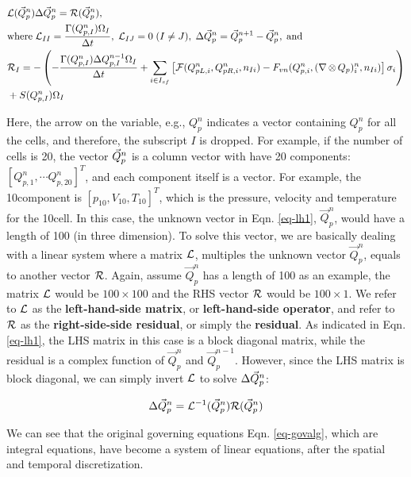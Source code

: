 \documentclass[12pt, letterpaper]{report}
\begin{document}
\begin{align}\label{eq-lh1}
   \begin{split}
      & \mathcal{L}(\vec{Q}_p^n) \Delta \vec{Q}_p^n = \mathcal{R}(\vec{Q}_p^n), \\ & \textrm{where} \; \mathcal{L}_{II} =
      \frac{\Gamma(Q_{p,I}^n)\Omega_I}{\Delta t}, \; \mathcal{L}_{IJ} = 0 \; (I \neq J), \; \Delta \vec{Q}_p^n =
      \vec{Q}_p^{n+1} - \vec{Q}_p^n, \; \textrm{and } \\
      & \mathcal{R}_I = -\left(-\frac{\Gamma(Q_{p,I}^n) \Delta Q_{p,I}^{n-1}\Omega_I}{\Delta t} + \sum_{i \in
            I_{sf}}\left[\mathcal{F}(Q_{pL,i}^n, Q_{pR,i}^n, n_{Ii}) - F_{vn}(Q_{p,i}^n, (\nabla
\mathop{\otimes} Q_p)_i^n, n_{Ii})\right]\sigma_i\right) \\ & + S(Q_{p,I}^n)\Omega_I
   \end{split}
\end{align}

Here, the arrow on the variable, e.g., $Q_p^n$ indicates a vector containing $Q_p^n$ for all the
cells, and therefore, the subscript $I$ is dropped. For example, if the number of cells is 20, the
vector $\vec{Q}_p^n$ is a column vector with have 20 components: $[Q_{p,1}^n, \cdots Q_{p,20}^n]^T$, and
each component itself is a vector. For example, the 10\th component is $[p_{10}, V_{10}, T_{10}]^T$,
which is the pressure, velocity and temperature for the 10\th cell. In this case, the unknown vector
in Eqn.  \ref{eq-lh1}, $\vec{Q}_p^n$, would have a length of 100 (in three dimension). To solve this
vector, we are basically dealing with a linear system where a matrix $\mathcal{L}$, multiples the unknown
vector $\vec{Q}_p^n$, equals to another vector $\mathcal{R}$. Again, assume $\vec{Q}_p^n$ has a length of 100
as an example, the matrix $\mathcal{L}$ would be $100 \times 100$ and the RHS vector $\mathcal{R}$ would be $100
\times 1$. We refer to $\mathcal{L}$ as the {\bf left-hand-side matrix}, or {\bf left-hand-side operator},
and refer to $\mathcal{R}$ as the {\bf right-side-side residual}, or simply the {\bf residual}. As indicated
in Eqn. \ref{eq-lh1}, the LHS matrix in this case is a block diagonal matrix, while the residual is
a complex function of $\vec{Q}_p^n$ and $\vec{Q}_p^{n-1}$. However, since the LHS matrix is block
diagonal, we can simply invert $\mathcal{L}$ to solve $\Delta \vec{Q}_p^n$:

\begin{align*}
   \Delta \vec{Q}_p^n = \mathcal{L}^{-1}(\vec{Q}_p^n) \mathcal{R}(\vec{Q}_p^n)
\end{align*}

We can see that the original governing equations Eqn. \ref{eq-govalg}, which are integral equations, have
become a system of linear equations, after the spatial and temporal discretization. \paraspace
\end{document}
